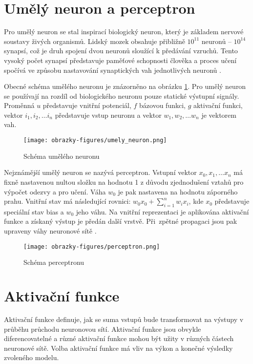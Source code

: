 \section{Umělý neuron a perceptron}
Pro umělý neuron se stal inspirací biologický neuron, který je základem nervové soustavy živých organismů. Lidský mozek obsahuje přibližně $10^{11}$ neuronů -- $10^{14}$ synapsí, což je druh spojení dvou neuronů sloužící k předávání vzruchů. Tento vysoký počet synapsí představuje paměťové schopnosti člověka a proces učení spočívá ve způsobu nastavování synaptických vah jednotlivých neuronů \cite{IZULecture}. 

Obecné schéma umělého neuronu je znázorněno na obrázku \ref{fig:umelyneuron}. Pro umělý neuron se používají na rozdíl od biologického neuronu pouze statické výstupní signály. Proměnná $u$ představuje vnitřní potenciál, $f$ bázovou funkci, $g$ aktivační funkci, vektor $i_1, i_2,\ldots i_n$ představuje vstup neuronu a vektor $w_1, w_2,\ldots w_n$ je vektorem vah. 

\begin{figure}[!htbp]
    \centering
    \texttt{[image: obrazky-figures/umely\_neuron.png]}
    \caption{Schéma umělého neuronu \cite{IZULecture}}
    \label{fig:umelyneuron}
\end{figure}


Nejznámější umělý neuron se nazývá perceptron. Vstupní vektor $x_0, x_1,\ldots x_n$ má fixně nastavenou nultou složku na hodnotu 1 z důvodu zjednodušení vztahů pro výpočet odezvy a pro učení. Váha $w_0$ je pak nastavena na hodnotu záporného prahu. Vnitřní stav má následující rovnici: $w_0x_0 + \sum_{i=1}^{n}w_ix_i$, kde $x_0$ představuje speciální stav bias a $w_0$ jeho váhu. Na vnitřní reprezentaci je aplikována aktivační funkce a získaný výstup je předán další vrstvě. Při~zpětné propagaci jsou pak upraveny váhy neuronové sítě \cite{IZULecture}.

\begin{figure}[!htbp]
    \centering
    \texttt{[image: obrazky-figures/perceptron.png]}
    \caption{Schéma perceptronu \cite{IZULecture}}
\end{figure}


\section{Aktivační funkce}
Aktivační funkce definuje, jak se suma vstupů bude transformovat na výstupy v průběhu průchodu neuronovou sítí. Aktivační funkce jsou obvykle diferencovatelné a různé aktivační funkce mohou být užity v různých částech neuronové sítě. Volba aktivační funkce má vliv na výkon a konečné výsledky zvoleného modelu. 


